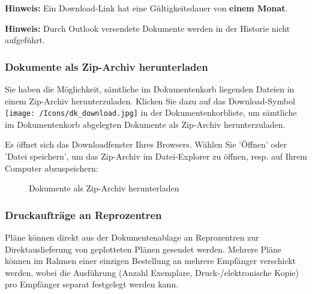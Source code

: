 \textbf{Hinweis:} Ein Download-Link hat eine Gültigkeitsdauer von \textbf{einem Monat}.

\vspace{\baselineskip}

\textbf{Hinweis:} Durch Outlook versendete Dokumente werden in der Historie nicht aufgeführt.

\vspace{\baselineskip}

\subsubsection{Dokumente als Zip-Archiv herunterladen}

Sie haben die Möglichkeit, sämtliche im Dokumentenkorb liegenden Dateien in einem Zip-Archiv herunterzuladen. Klicken Sie dazu auf das Download-Symbol \texttt{[image: /Icons/dk\_download.jpg]} in der Dokumentenkorbliste, um sämtliche im Dokumentenkorb abgelegten Dokumente als Zip-Archiv herunterzuladen.

\vspace{\baselineskip}

Es öffnet sich das Downloadfenster Ihres Browsers. Wählen Sie 'Öffnen' oder 'Datei speichern', um das Zip-Archiv im Datei-Explorer zu öffnen, resp. auf Ihrem Computer abzuspeichern:

\begin{figure}[H]
\caption{Dokumente als Zip-Archiv herunterladen}
\end{figure}

\subsubsection{Druckaufträge an Reprozentren}
\label{bkm:Ref20170609127}

Pläne können direkt aus der Dokumentenablage an Reprozentren zur Direktauslieferung von geplotteten Plänen gesendet werden. Mehrere Pläne können im Rahmen einer einzigen Bestellung an mehrere Empfänger verschickt werden, wobei die Ausführung (Anzahl Exemplare, Druck-/elektronische Kopie) pro Empfänger separat festgelegt werden kann.

